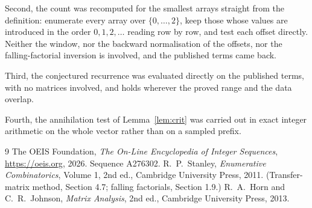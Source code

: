 \documentclass[11pt,a4paper]{article}
\theoremstyle{plain}
\theoremstyle{definition}
\begin{document}
Second, the count was recomputed for the smallest arrays straight from the definition:
enumerate every array over $\{0,\dots,2\}$, keep those whose values are introduced in the
order $0,1,2,\dots$ reading row by row, and test each offset directly. Neither the window, nor
the backward normalisation of the offsets, nor the falling-factorial inversion is involved, and
the published terms came back.

Third, the conjectured recurrence was evaluated directly on the published terms, with no
matrices involved, and holds wherever the proved range and the data overlap.

Fourth, the annihilation test of Lemma~\ref{lem:crit} was carried out in exact integer
arithmetic on the whole vector rather than on a sampled prefix.

\begin{thebibliography}{9}
 The OEIS Foundation, \emph{The On-Line Encyclopedia of Integer
Sequences}, \url{https://oeis.org}, 2026. Sequence A276302.
 R.~P.~Stanley, \emph{Enumerative Combinatorics}, Volume 1, 2nd ed.,
Cambridge University Press, 2011. (Transfer-matrix method, Section 4.7; falling factorials,
Section 1.9.)
 R.~A.~Horn and C.~R.~Johnson, \emph{Matrix Analysis}, 2nd ed., Cambridge
University Press, 2013.
\end{thebibliography}
\end{document}
